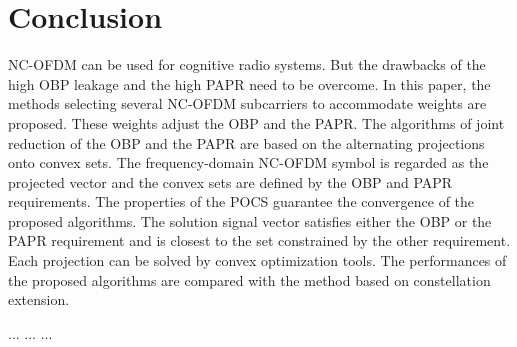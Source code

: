 \documentclass[paper]{ieice}
\begin{document}
\section{Conclusion}
\label{sec:conclusion}
NC-OFDM can be used for cognitive radio systems. But the drawbacks of the high OBP leakage and the high PAPR need to be overcome. In this paper, the methods selecting several NC-OFDM subcarriers to accommodate weights are proposed.  These weights adjust the OBP and the PAPR. The algorithms of joint reduction of the OBP and the PAPR are based on the alternating projections onto convex sets. The frequency-domain NC-OFDM symbol is regarded as the projected vector and the convex sets are defined by the OBP and PAPR requirements.  The properties of the POCS guarantee the convergence of the proposed algorithms. The solution signal vector satisfies either the OBP or the PAPR requirement and is closest to the set constrained by the other requirement. Each projection can be solved by convex optimization tools. The performances of the proposed algorithms are compared with the method based on constellation extension.





\appendix
 ... ... ...
\end{document}

